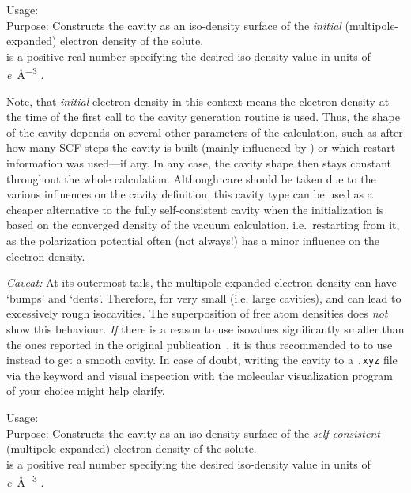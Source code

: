 {
  \noindent
  Usage:  
     \\[1.0ex] 
  Purpose: Constructs the cavity as an iso-density surface of the 
    \emph{initial} (multipole-expanded) electron density of the solute. \\[1.0ex]
   is a positive real number specifying the 
    desired iso-density value in units of 
    \si{\elementarycharge\per\cubic\angstrom} .
}

Note, that \emph{initial} electron density in this context means 
the electron density at the time of the first call to the cavity 
generation routine is used. Thus, the shape of the cavity depends 
on several other parameters of the calculation, such as after how 
many SCF steps the cavity is built (mainly influenced by 
) or which restart 
information was used---if any. 
In any case, the cavity shape then stays constant throughout 
the whole calculation. 
Although care should be taken due to the various influences on the 
cavity definition, this cavity type can be used as a cheaper 
alternative to the fully self-consistent cavity when the 
initialization is based on the converged density of the vacuum 
calculation, i.e.~restarting from it, as the polarization 
potential often (not always!) has a minor influence on the 
electron density.

\emph{Caveat:} At its outermost tails, the multipole-expanded electron density
can have `bumps' and `dents'. Therefore, for very small  (i.e.
large cavities),  and
 can lead to excessively
rough isocavities. The superposition of free atom densities does \emph{not} show
this behaviour. \emph{If} there is a reason to use isovalues significantly smaller
than the ones reported in the original publication~\cite{Sinstein2017_MPE}, it is
thus recommended to to use  instead to get
a smooth cavity. In case of doubt, writing the cavity to a \texttt{.xyz} file via
the  keyword and visual inspection with the
molecular visualization program of your choice might help clarify.

{
  \noindent
  Usage:  
     \\[1.0ex] 
  Purpose: Constructs the cavity as an iso-density surface of the 
    \emph{self-consistent} (multipole-expanded) electron density 
    of the solute. \\[1.0ex]
   is a positive real number specifying the 
    desired iso-density value in units of 
    \si{\elementarycharge\per\cubic\angstrom} .
}

